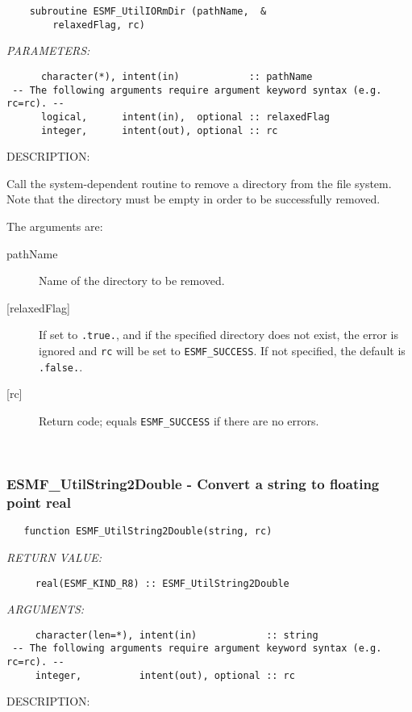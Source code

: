  
\begin{verbatim}    subroutine ESMF_UtilIORmDir (pathName,  &
        relaxedFlag, rc)\end{verbatim}{\em PARAMETERS:}
\begin{verbatim}      character(*), intent(in)            :: pathName
 -- The following arguments require argument keyword syntax (e.g. rc=rc). --
      logical,      intent(in),  optional :: relaxedFlag
      integer,      intent(out), optional :: rc\end{verbatim}
{\sf DESCRIPTION:\\ }


     Call the system-dependent routine to remove a directory from the file
     system.  Note that the directory must be empty in order to be successfully
     removed.
  
       The arguments are:
       \begin{description}
       \item[pathName]
         Name of the directory to be removed.
       \item[{[relaxedFlag]}]
         If set to {\tt .true.}, and if the specified directory does not exist,
         the error is ignored and {\tt rc} will be set to {\tt ESMF\_SUCCESS}.
         If not specified, the default is {\tt .false.}.
       \item[{[rc]}]
         Return code; equals {\tt ESMF\_SUCCESS} if there are no errors.
       \end{description} 
 
\mbox{}\hrulefill\ 
 
\subsubsection [ESMF\_UtilString2Double] {ESMF\_UtilString2Double - Convert a string to floating point real}


\begin{verbatim}   function ESMF_UtilString2Double(string, rc)\end{verbatim}{\em RETURN VALUE:}
\begin{verbatim}     real(ESMF_KIND_R8) :: ESMF_UtilString2Double\end{verbatim}{\em ARGUMENTS:}
\begin{verbatim}     character(len=*), intent(in)            :: string
 -- The following arguments require argument keyword syntax (e.g. rc=rc). --
     integer,          intent(out), optional :: rc\end{verbatim}
{\sf DESCRIPTION:\\ }



